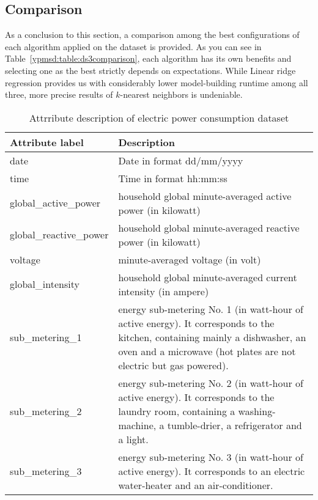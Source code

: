 \subsection{Comparison}

As a conclusion to this section, a comparison among the best
configurations of each algorithm applied on the dataset is provided. As you can
see in Table~\ref{ypmsd:table:ds3comparison}, each algorithm has its own
benefits and selecting one as the best strictly depends on expectations.
While Linear ridge regression provides us with considerably lower model-building runtime
among all three, more precise results of $k$-nearest neighbors is undeniable.
















\begin{table}[p]
	\begin{center}
		\begin{tabular}{|p{4cm}|p{10cm}|}
			\hline	{\bf Attribute label}&{ \bf Description}\\
\hline date &   Date in format dd/mm/yyyy\\\hline
time &  	Time in format hh:mm:ss  \\\hline 
global\_active\_power & household global minute-averaged active power (in
kilowatt)  \\
\hline global\_reactive\_power & household global minute-averaged reactive power
(in kilowatt)  \\
\hline voltage & minute-averaged voltage (in volt)  \\
\hline global\_intensity & household global minute-averaged current intensity
(in ampere)  \\
\hline sub\_metering\_1 & energy sub-metering No. 1 (in watt-hour of active
energy). It corresponds to the kitchen, containing mainly a dishwasher, 
an oven and a microwave (hot plates are not electric but gas powered).  \\
\hline sub\_metering\_2 & energy sub-metering No. 2 (in watt-hour of active
energy). It corresponds to the laundry room, containing a washing-machine, a tumble-drier, a refrigerator and a light.  \\
\hline sub\_metering\_3 & energy sub-metering No. 3 (in watt-hour of active 
energy). It corresponds to an electric water-heater and an air-conditioner.
\\\hline
\end{tabular}
\end{center}
\caption{Attrribute description of electric power consumption
dataset\label{ypmsd:table:ds3attributes}}

\end{table}





